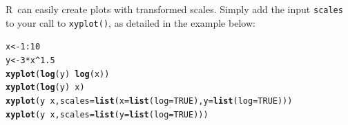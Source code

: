 \documentclass[twoside]{book}\usepackage[]{graphicx}\usepackage[]{xcolor}
\makeatletter
\newcommand{\hlnum}[1]{\textcolor[rgb]{0.686,0.059,0.569}{#1}}%
\newcommand{\hlopt}[1]{\textcolor[rgb]{0,0,0}{#1}}%
\newcommand{\hlstd}[1]{\textcolor[rgb]{0.345,0.345,0.345}{#1}}%
\newcommand{\hlkwb}[1]{\textcolor[rgb]{0.69,0.353,0.396}{#1}}%
\newcommand{\hlkwc}[1]{\textcolor[rgb]{0.333,0.667,0.333}{#1}}%
\newcommand{\hlkwd}[1]{\textcolor[rgb]{0.737,0.353,0.396}{\textbf{#1}}}%
\newenvironment{kframe}{%
 \def\at@end@of@kframe{}%
 \ifinner\ifhmode%
  \def\at@end@of@kframe{\end{minipage}}%
  \begin{minipage}{\columnwidth}%
 \fi\fi%
 \def\FrameCommand##1{\hskip\@totalleftmargin \hskip-\fboxsep
 \colorbox{shadecolor}{##1}\hskip-\fboxsep
     \hskip-\linewidth \hskip-\@totalleftmargin \hskip\columnwidth}%
 \MakeFramed {\advance\hsize-\width
   \@totalleftmargin\z@ \linewidth\hsize
   \@setminipage}}%
 {\par\unskip\endMakeFramed%
 \at@end@of@kframe}
\newenvironment{knitrout}{}{} %
\def\R{{\sf R}}
\newcounter{example}[section]
\makeatother
\begin{document}
\R\ can easily create plots with transformed scales.  Simply add the input \texttt{scales} to your call to \texttt{xyplot()}, as detailed in the example below:
\begin{knitrout}
\color{fgcolor}\begin{kframe}
\begin{alltt}
\hlstd{x} \hlkwb{<-} \hlnum{1}\hlopt{:}\hlnum{10}
\hlstd{y} \hlkwb{<-} \hlnum{3} \hlopt{*} \hlstd{x}\hlopt{^}\hlnum{1.5}
\hlkwd{xyplot}\hlstd{(}\hlkwd{log}\hlstd{(y)} \hlopt{~} \hlkwd{log}\hlstd{(x))}
\hlkwd{xyplot}\hlstd{(}\hlkwd{log}\hlstd{(y)} \hlopt{~} \hlstd{x)}
\hlkwd{xyplot}\hlstd{(y} \hlopt{~} \hlstd{x,} \hlkwc{scales}\hlstd{=}\hlkwd{list}\hlstd{(}\hlkwc{x}\hlstd{=}\hlkwd{list}\hlstd{(}\hlkwc{log}\hlstd{=}\hlnum{TRUE}\hlstd{),} \hlkwc{y}\hlstd{=}\hlkwd{list}\hlstd{(}\hlkwc{log}\hlstd{=}\hlnum{TRUE}\hlstd{)))}
\hlkwd{xyplot}\hlstd{(y} \hlopt{~} \hlstd{x,} \hlkwc{scales}\hlstd{=}\hlkwd{list}\hlstd{(}\hlkwc{y}\hlstd{=}\hlkwd{list}\hlstd{(}\hlkwc{log}\hlstd{=}\hlnum{TRUE}\hlstd{)))}
\end{alltt}
\end{kframe}


\end{knitrout}
\end{document}
